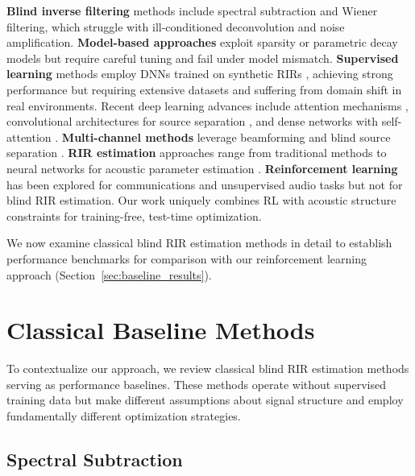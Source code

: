 \documentclass[12pt,a4paper]{article}
\begin{document}
\textbf{Blind inverse filtering} methods include spectral subtraction \cite{boll1979suppression} and Wiener filtering, which struggle with ill-conditioned deconvolution and noise amplification. \textbf{Model-based approaches} exploit sparsity \cite{wu2017direct} or parametric decay models \cite{habets2008new} but require careful tuning and fail under model mismatch. \textbf{Supervised learning} methods employ DNNs trained on synthetic RIRs \cite{kinoshita2017neural,han2015learning,weninger2015speech}, achieving strong performance but requiring extensive datasets and suffering from domain shift in real environments. Recent deep learning advances include attention mechanisms \cite{vaswani2017attention}, convolutional architectures for source separation \cite{luo2019conv}, and dense networks with self-attention \cite{pandey2022dense}. \textbf{Multi-channel methods} leverage beamforming \cite{gannot2017consolidated,erdogan2016improved} and blind source separation \cite{makino2007blind,naylor2010speech}. \textbf{RIR estimation} approaches range from traditional methods \cite{allen1979image,schroeder1965new} to neural networks for acoustic parameter estimation \cite{bryan2020impulse,gamper2018blind,looney2020joint}. \textbf{Reinforcement learning} has been explored for communications \cite{ernst2018learning} and unsupervised audio tasks \cite{wisdom2020unsupervised} but not for blind RIR estimation. Our work uniquely combines RL with acoustic structure constraints for training-free, test-time optimization.

We now examine classical blind RIR estimation methods in detail to establish performance benchmarks for comparison with our reinforcement learning approach (Section~\ref{sec:baseline_results}).

\section{Classical Baseline Methods}
\label{sec:baselines}

To contextualize our approach, we review classical blind RIR estimation methods serving as performance baselines. These methods operate without supervised training data but make different assumptions about signal structure and employ fundamentally different optimization strategies.

\subsection{Spectral Subtraction}
\end{document}
